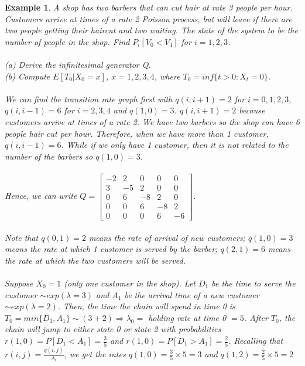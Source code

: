 \documentclass[12pt]{article}
\newtheorem{example}{Example}
\begin{document}
\begin{example}
    A shop has two barbers that can cut hair at rate 3 people per hour. Customers arrive at times of a rate 2 Poisson process, but will leave if there are two people getting their haircut and two waiting. The state of the system to be the number of people in the shop. Find $P_i[V_0 < V_4]$ for $i = 1,2,3$.
    \\
    \\(a) Derive the infinitesimal generator Q.
    \\(b) Compute $E[T_0|X_0=x]$, $x = 1,2,3,4$, where $T_0 = inf\{t>0: X_t=0\}$.
    \\
    \\We can find the transition rate graph first with $q(i,i+1) = 2$ for $i = 0,1,2,3$, $q(i,i-1)=6$ for $i = 2,3,4$ and $q(1,0) = 3$. $q(i,i+1) = 2$ because customers arrive at times of a rate 2. We have two barbers so the shop can have 6 people hair cut per hour. Therefore, when we have more than 1 customer, $q(i,i-1)=6$. While if we only have 1 customer, then it is not related to the number of the barbers so $q(1,0) = 3$.
    \\
    \\Hence, we can write $Q = \begin{bmatrix}
         -2 & 2 & 0 & 0 & 0 \\
         3 & -5 & 2 & 0 & 0\\
         0 & 6 & -8 & 2 & 0\\
         0 & 0 & 6 & -8 & 2\\
         0 & 0 & 0 & 6 & -6
        \end{bmatrix}$.
    \\
    \\Note that $q(0,1)=2$ means the rate of arrival of new customers; $q(1,0)=3$ means the rate at which 1 customer is served by the barber; $q(2,1)=6$ means the rate at which the two customers will be served.
    \\
    \\Suppose $X_0 = 1$ (only one customer in the shop). Let $D_1$ be the time to serve the customer $\sim exp(\lambda=3)$ and $A_1$ be the arrival time of a new customer $\sim exp(\lambda=2)$. Then, the time the chain will spend in time 0 is $T_0 = min\{D_1,A_1\} \sim(3+2) \Rightarrow \lambda_0 = $ holding rate at time 0 $= 5$. After $T_0$, the chain will jump to either state 0 or state 2 with probabilities $r(1,0) = P[D_1 < A_1] = \frac{3}{5}$ and $r(1,0) = P[D_1 > A_1] = \frac{2}{5}$. Recalling that $r(i,j) = \frac{q(i,j)}{\lambda_i}$, we get the rates $q(1,0) = \frac{3}{5}\times5=3$ and $q(1,2) = \frac{2}{5}\times5=2$

\end{example}
\end{document}
